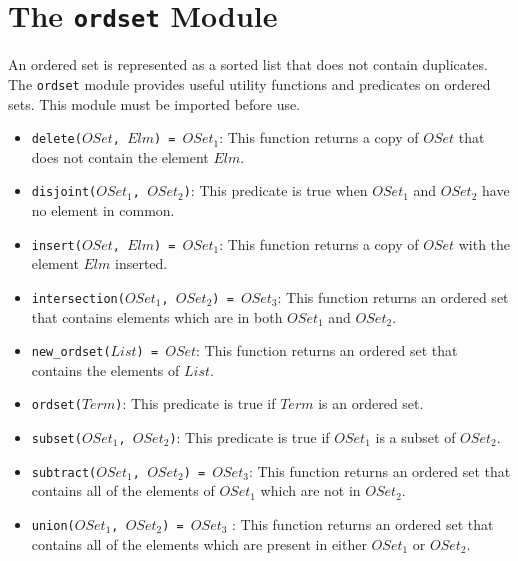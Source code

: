 \chapter{The \texttt{ordset} Module}
An ordered set is represented as a sorted list that does not contain duplicates. The \texttt{ordset} module provides useful utility functions and predicates on ordered sets. This module must be imported before use.

\begin{itemize}
\item \texttt{delete($OSet$, $Elm$) = $OSet_1$}: This function returns a copy of $OSet$ that does not contain the element $Elm$.
\item \texttt{disjoint($OSet_1$, $OSet_2$)}: This predicate is true when $OSet_1$ and $OSet_2$ have no element in common. 
\item \texttt{insert($OSet$, $Elm$) = $OSet_1$}: This function returns a copy of $OSet$ with the element $Elm$ inserted.
\item \texttt{intersection($OSet_1$, $OSet_2$) = $OSet_3$}: This function returns an ordered set that contains elements which are in both $OSet_1$ and $OSet_2$.
\item \texttt{new\_ordset($List$) = $OSet$}: This function returns an ordered set that contains the elements of $List$.
\item \texttt{ordset($Term$)}: This predicate is true if $Term$ is an ordered set.
\item \texttt{subset($OSet_1$, $OSet_2$)}: This predicate is true if $OSet_1$ is a subset of $OSet_2$.
\item \texttt{subtract($OSet_1$, $OSet_2$) = $OSet_3$}: This function returns an ordered set that contains all of the elements of $OSet_1$ which are not in $OSet_2$.
\item \texttt{union($OSet_1$, $OSet_2$) = $OSet_3$} : This function returns an ordered set that contains all of the elements which are present in either $OSet_1$ or $OSet_2$.
\end{itemize}

\ignore{

}
